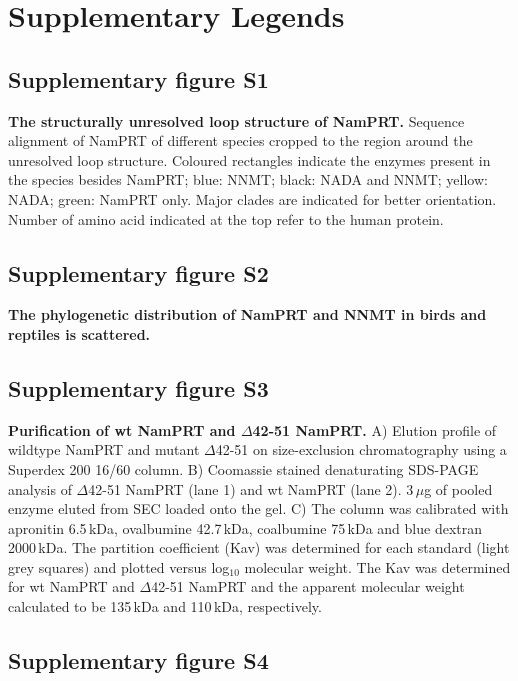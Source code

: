 
\section*{Supplementary Legends}

\subsection*{Supplementary figure S1}

\textbf{The structurally unresolved loop structure of NamPRT.} Sequence alignment of NamPRT of different species cropped to the region around the unresolved loop structure. Coloured rectangles indicate the enzymes present in the species besides NamPRT; blue: NNMT; black: NADA and NNMT; yellow: NADA; green: NamPRT only. Major clades are indicated for better orientation. Number of amino acid indicated at the top refer to the human protein.


\subsection*{Supplementary figure S2}

\textbf{The phylogenetic distribution of NamPRT and NNMT in birds and reptiles is scattered.}


\subsection*{Supplementary figure S3}

\textbf{Purification of wt NamPRT and $\Delta$42-51 NamPRT.} A) Elution profile of wildtype NamPRT and mutant $\Delta$42-51 on size-exclusion chromatography using a Superdex 200 16/60 column. B) Coomassie stained denaturating SDS-PAGE analysis of $\Delta$42-51 NamPRT (lane 1) and wt NamPRT (lane 2). 3\,$\mu$g of pooled enzyme eluted from SEC loaded onto the gel. C) The column was calibrated with apronitin 6.5\,kDa, ovalbumine 42.7\,kDa, coalbumine 75\,kDa and blue dextran 2000\,kDa. The partition coefficient (Kav) was determined for each standard (light grey squares) and plotted versus log$_{10}$ molecular weight. The Kav was determined for wt NamPRT and $\Delta$42-51 NamPRT and the apparent molecular weight calculated to be 135\,kDa and 110\,kDa, respectively.


\subsection*{Supplementary figure S4}

